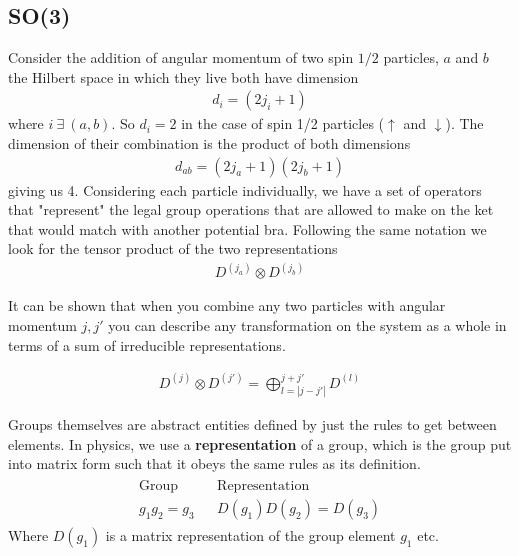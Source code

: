 \subsection{SO(3)}
Consider the addition of angular momentum of two spin $1/2$ particles, $a$ and $b$ the Hilbert space in which they live both have dimension
\begin{align}
d_i = (2j_i + 1)
\end{align}
where $i ~\exists~(a,b)$. So $d_i = 2$ in the case of spin 1/2 particles ($\uparrow$ and $\downarrow$). The dimension of their combination is the product of both dimensions
\begin{align}
d_{ab} = (2j_a+1)(2j_b+1)
\end{align}
giving us 4. Considering each particle individually, we have a set of operators that "represent" the legal group operations that are allowed to make on the ket that would match with another potential bra. Following the same notation we look for the tensor product of the two representations
\begin{align}
D^{(j_a)}\otimes D^{(j_b)}
\end{align}

It can be shown \cite{sakurai} that when you combine any two particles with angular momentum $j, j'$ you can describe any transformation on the system as a whole in terms of a sum of irreducible representations.

\begin{align}
D^{(j)}\otimes D^{(j')} = \bigoplus^{j+j'}_{l=|j-j'|} D^{(l)}
\end{align}

Groups themselves are abstract entities defined by just the rules to get between elements. In physics, we use a \textbf{representation} of a group, which is the group put into matrix form such that it obeys the same rules as its definition.
\begin{gather}
\begin{align}
\textrm{Group} && \textrm{Representation}\\
g_1g_2 = g_3 && D(g_1)D(g_2) = D(g_3)
\end{align}
\end{gather}
Where $D(g_1)$ is a matrix representation of the group element $g_1$ etc. 
